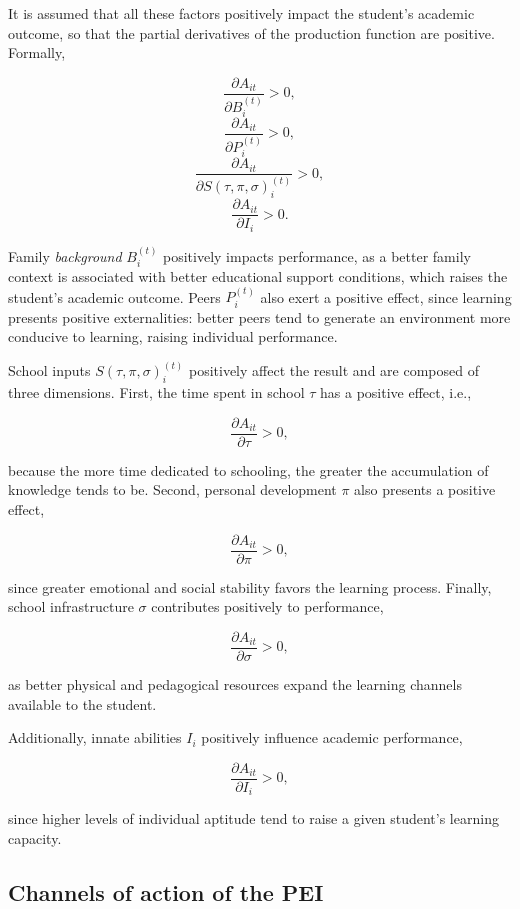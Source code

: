 It is assumed that all these factors positively impact the student's academic outcome, so that the partial derivatives of the production function are positive. Formally,

$$\frac{\partial A_{it}}{\partial B_{i}^{(t)}} > 0,$$
$$\quad$$
$$\frac{\partial A_{it}}{\partial P_{i}^{(t)}} > 0,$$
$$\quad$$
$$\frac{\partial A_{it}}{\partial S(\tau,\pi,\sigma)_{i}^{(t)}} > 0,$$
$$\quad$$
$$\frac{\partial A_{it}}{\partial I_{i}} > 0.$$

Family \textit{background} $B_{i}^{(t)}$ positively impacts performance, as a better family context is associated with better educational support conditions, which raises the student's academic outcome. Peers $P_{i}^{(t)}$ also exert a positive effect, since learning presents positive externalities: better peers tend to generate an environment more conducive to learning, raising individual performance.

School inputs $S(\tau,\pi,\sigma)_{i}^{(t)}$ positively affect the result and are composed of three dimensions. First, the time spent in school $\tau$ has a positive effect, i.e.,

$$\frac{\partial A_{it}}{\partial \tau} > 0,$$

because the more time dedicated to schooling, the greater the accumulation of knowledge tends to be. Second, personal development $\pi$ also presents a positive effect,

$$\frac{\partial A_{it}}{\partial \pi} > 0,$$

since greater emotional and social stability favors the learning process. Finally, school infrastructure $\sigma$ contributes positively to performance,

$$\frac{\partial A_{it}}{\partial \sigma} > 0,$$

as better physical and pedagogical resources expand the learning channels available to the student.

Additionally, innate abilities $I_{i}$ positively influence academic performance,

$$\frac{\partial A_{it}}{\partial I_{i}} > 0,$$

since higher levels of individual aptitude tend to raise a given student's learning capacity.

\subsection{Channels of action of the PEI}


